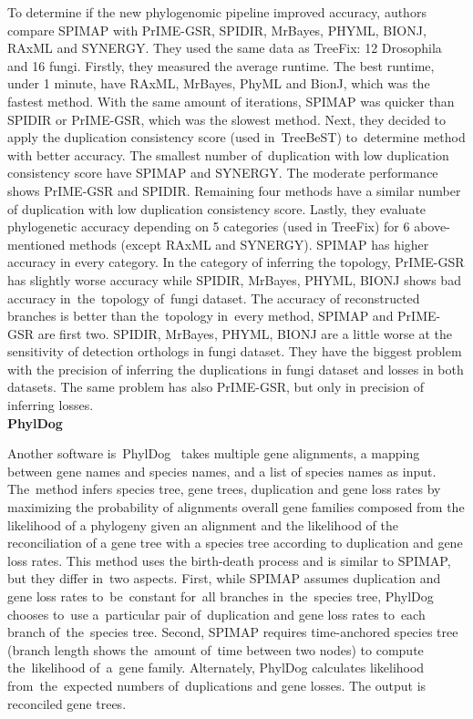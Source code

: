 To determine if the new phylogenomic pipeline improved accuracy, authors compare SPIMAP with PrIME-GSR, SPIDIR, MrBayes, PHYML, BIONJ, RAxML and SYNERGY. They used the same data as TreeFix: 12 Drosophila and 16 fungi. Firstly, they measured the average runtime. The best runtime, under 1 minute, have RAxML, MrBayes, PhyML and BionJ, which was the fastest method. With the same amount of iterations, SPIMAP was quicker than SPIDIR or PrIME-GSR, which was the slowest method. Next, they decided to apply the duplication consistency score (used in~TreeBeST) to~determine method with better accuracy. The smallest number of~duplication with low duplication consistency score have SPIMAP and SYNERGY. The moderate performance shows PrIME-GSR and SPIDIR. Remaining four methods have a similar number of duplication with low duplication consistency score. Lastly, they evaluate phylogenetic accuracy depending on 5 categories (used in TreeFix) for 6 above-mentioned methods (except RAxML and SYNERGY). SPIMAP has higher accuracy in every category. In the category of inferring the topology, PrIME-GSR has slightly worse accuracy while SPIDIR, MrBayes, PHYML, BIONJ shows bad accuracy in~the~topology of~fungi dataset. The accuracy of reconstructed branches is better than the~topology in~every method, SPIMAP and PrIME-GSR are first two. SPIDIR, MrBayes, PHYML, BIONJ are a little worse at the sensitivity of detection orthologs in fungi dataset. They have the biggest problem with the precision of inferring the duplications in fungi dataset and losses in both datasets. The same problem has also PrIME-GSR, but only in precision of inferring losses.\\
\textbf{PhylDog}

Another software is~PhylDog~\cite{phyldog_online} takes multiple gene alignments, a mapping between gene names and species names, and a list of species names as input. The~method infers species tree, gene trees, duplication and gene loss rates by maximizing the probability of alignments overall gene families composed from the likelihood of a phylogeny given an alignment and the likelihood of the reconciliation of a gene tree with a species tree according to duplication and gene loss rates. This method uses the birth-death process and is similar to SPIMAP, but they differ in~two aspects. First, while SPIMAP assumes duplication and gene loss rates to~be~constant for~all branches in~the~species tree, PhylDog chooses to~use a~particular pair of~duplication and gene loss rates to~each branch of~the~species tree. Second, SPIMAP requires time-anchored species tree (branch length shows the~amount of~time between two nodes) to compute the~likelihood of~a~gene family. Alternately, PhylDog calculates likelihood from~the~expected numbers of~duplications and gene losses. The output is reconciled gene trees.

